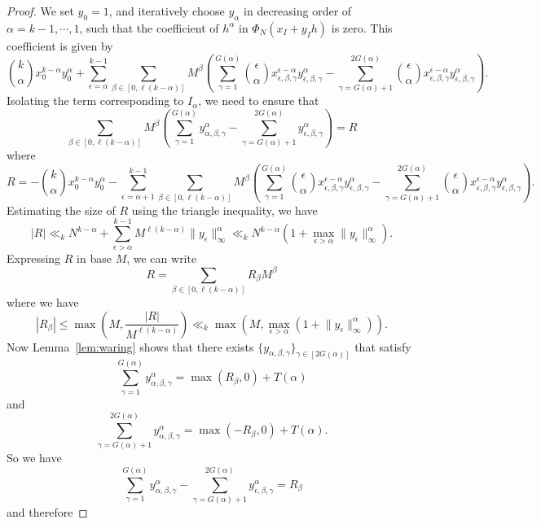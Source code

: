 \documentclass[12pt,reqno]{amsart}
\theoremstyle{plain}
\theoremstyle{definition}
\newcommand{\1}{\mathbf{1}}
\newcommand{\abs}[1]{\left|#1\right|}
\newcommand{\infnorm}[1]{\lVert #1 \rVert_\infty}
\begin{document}
\begin{proof}
    We set $y_0 = 1$, and iteratively choose $y_{\alpha}$ in decreasing order of $\alpha = k - 1 , \cdots, 1$, such that the coefficient of $h^{\alpha}$ in $\Phi_N(x_I + y_I h) $ is zero. This coefficient is given by
    $$\binom{k}{\alpha} x_{0}^{k - \alpha} y_0^{\alpha} + \sum_{\epsilon = \alpha}^{k - 1} \sum_{\beta \in [0, \ell (k - \alpha)]} M^{\beta} \left(\sum_{\gamma = 1}^{G(\alpha)} \binom{\epsilon}{\alpha} x_{\epsilon, \beta, \gamma}^{\epsilon - \alpha} y_{\epsilon, \beta, \gamma}^{\alpha} -  \sum_{\gamma = G(\alpha) + 1}^{2G(\alpha)} \binom{\epsilon}{\alpha} x_{\epsilon, \beta, \gamma}^{\epsilon - \alpha} y_{\epsilon, \beta, \gamma}^{\alpha}\right).$$
    Isolating the term corresponding to $I_{\alpha}$, we need to ensure that
    $$\sum_{\beta \in [0, \ell (k - \alpha)]} M^{\beta} \left(\sum_{\gamma = 1}^{G(\alpha)} y_{\alpha, \beta, \gamma}^{\alpha} -  \sum_{\gamma = G(\alpha) + 1}^{2G(\alpha)} y_{\epsilon, \beta, \gamma}^{\alpha}\right) = R$$
    where
    $$R = - \binom{k}{\alpha} x_{0}^{k - \alpha} y_0^{\alpha} - \sum_{\epsilon = \alpha + 1}^{k - 1} \sum_{\beta \in [0, \ell (k - \alpha)]} M^{\beta} \left(\sum_{\gamma = 1}^{G(\alpha)} \binom{\epsilon}{\alpha} x_{\epsilon, \beta, \gamma}^{\epsilon - \alpha} y_{\epsilon, \beta, \gamma}^{\alpha} -  \sum_{\gamma = G(\alpha) + 1}^{2G(\alpha)} \binom{\epsilon}{\alpha} x_{\epsilon, \beta, \gamma}^{\epsilon - \alpha} y_{\epsilon, \beta, \gamma}^{\alpha}\right).$$
    Estimating the size of $R$ using the triangle inequality, we have
    $$\abs{R} \ll_k N^{k - \alpha} + \sum_{\epsilon > \alpha}^{k - 1} M^{\ell (k - \alpha)} \infnorm{y_{\epsilon}}^{\alpha} \ll_k  N^{k - \alpha} (1 + \max_{\epsilon > \alpha} \infnorm{y_{\epsilon}}^{\alpha}).$$
    Expressing $R$ in base $M$, we can write
    $$R = \sum_{\beta \in [0, \ell(k - \alpha)]} R_{\beta} M^{\beta}$$
    where we have 
    $$\abs{R_{\beta}} \leq \max\left(M, \frac{\abs{R}}{M^{\ell (k - \alpha)}}\right) \ll_k \max\left(M, \max_{\epsilon > \alpha} (1 + \infnorm{y_{\epsilon}}^{\alpha}) \right).$$
    Now Lemma~\ref{lem:waring} shows that there exists $\{y_{\alpha, \beta, \gamma}\}_{\gamma \in [2G(\alpha)]}$ that satisfy
    $$\sum_{\gamma = 1}^{G(\alpha)} y_{\alpha, \beta, \gamma}^{\alpha} = \max(R_{\beta}, 0) + T(\alpha)$$
    and 
    $$\sum_{\gamma = G(\alpha) + 1 }^{2G(\alpha)} y_{\alpha, \beta, \gamma}^{\alpha} = \max(-R_{\beta}, 0) + T(\alpha).$$
    So we have
    $$\sum_{\gamma = 1}^{G(\alpha)} y_{\alpha, \beta, \gamma}^{\alpha} -  \sum_{\gamma = G(\alpha) + 1}^{2G(\alpha)} y_{\epsilon, \beta, \gamma}^{\alpha} = R_{\beta}$$
    and therefore

\end{proof}
\end{document}
